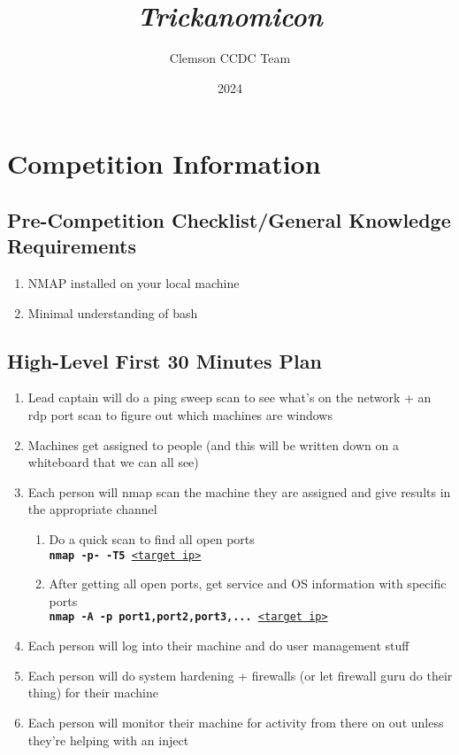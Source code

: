 \documentclass[12pt,letterpaper]{article}
\title{\color{iris}\huge{\bf{\it{Trickanomicon}}}}
\author{\color{muted}Clemson CCDC Team}
\date{\color{subtle}2024}
\def\code#1{\textcolor{iris}{\texttt{#1}}}
\def\bf#1{\textbf{#1}}
\def\ul#1{\underline{#1}}
\begin{document}
\maketitle

\pagebreak

\tableofcontents

\pagebreak

\section{Competition Information}

\subsection{Pre-Competition Checklist/General Knowledge Requirements}

\begin{enumerate}
	\item NMAP installed on your local machine
	\item Minimal understanding of bash
\end{enumerate}

\subsection{High-Level First 30 Minutes Plan}

\begin{enumerate}
	\item Lead captain will do a ping sweep scan to see what's on the network + an rdp port scan to figure out which machines are windows

	\item Machines get assigned to people (and this will be written down on a whiteboard that we can all see)

	\item Each person will nmap scan the machine they are assigned and give results in the appropriate channel
		\begin{enumerate} \label{nmap}
		\item Do a quick scan to find all open ports \\
			\code{\bf{nmap -p- -T5} \ul{<target ip>}}
		\item After getting all open ports, get service and OS information with specific ports \\
			\code{\bf{nmap -A -p port1,port2,port3,...} \ul{<target ip>}}
	\end{enumerate}

	\item Each person will log into their machine and do user management stuff

	\item Each person will do system hardening + firewalls (or let firewall guru do their thing) for their machine

	\item Each person will monitor their machine for activity from there on out unless they're helping with an inject
\end{enumerate}
\end{document}
